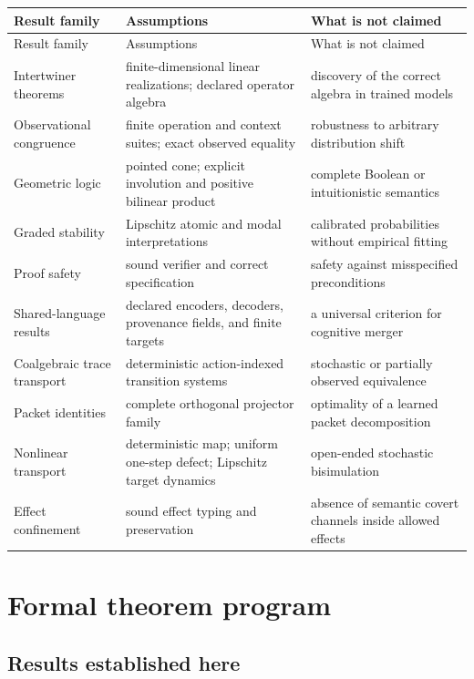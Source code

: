 \documentclass[11pt]{article}
\theoremstyle{definition}
\theoremstyle{remark}
\begin{document}
\begin{longtable}{p{}p{}p{}}
\toprule
Result family & Assumptions & What is not claimed \\
\midrule
\endfirsthead
\toprule
Result family & Assumptions & What is not claimed \\
\midrule
\endhead
Intertwiner theorems & finite-dimensional linear realizations; declared operator algebra & discovery of the correct algebra in trained models \\
Observational congruence & finite operation and context suites; exact observed equality & robustness to arbitrary distribution shift \\
Geometric logic & pointed cone; explicit involution and positive bilinear product & complete Boolean or intuitionistic semantics \\
Graded stability & Lipschitz atomic and modal interpretations & calibrated probabilities without empirical fitting \\
Proof safety & sound verifier and correct specification & safety against misspecified preconditions \\
Shared-language results & declared encoders, decoders, provenance fields, and finite targets & a universal criterion for cognitive merger \\
Coalgebraic trace transport & deterministic action-indexed transition systems & stochastic or partially observed equivalence \\
Packet identities & complete orthogonal projector family & optimality of a learned packet decomposition \\
Nonlinear transport & deterministic map; uniform one-step defect; Lipschitz target dynamics & open-ended stochastic bisimulation \\
Effect confinement & sound effect typing and preservation & absence of semantic covert channels inside allowed effects \\
\bottomrule
\end{longtable}

\section{Formal theorem program}

\subsection{Results established here}
\end{document}
